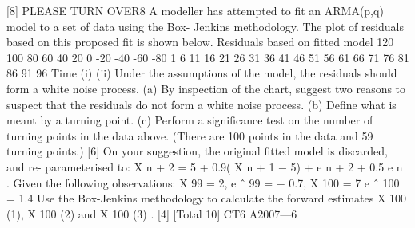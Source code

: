 \documentclass[a4paper,12pt]{article}
\begin{document}
[8]
PLEASE TURN OVER8
A modeller has attempted to fit an ARMA(p,q) model to a set of data using the Box-
Jenkins methodology. The plot of residuals based on this proposed fit is shown
below.
Residuals based on fitted model
120
100
80
60
40
20
0
-20
-40
-60
-80
1
6 11 16 21 26 31 36 41 46 51 56 61 66 71 76 81 86 91 96
Time
(i)
(ii)
Under the assumptions of the model, the residuals should form a white noise
process.
(a) By inspection of the chart, suggest two reasons to suspect that the
residuals do not form a white noise process.
(b) Define what is meant by a turning point.
(c) Perform a significance test on the number of turning points in the data
above. (There are 100 points in the data and 59 turning points.)
[6]
On your suggestion, the original fitted model is discarded, and re-
parameterised to:
X n + 2 = 5 + 0.9( X n + 1 − 5) + e n + 2 + 0.5 e n .
Given the following observations:
X 99 = 2,
e ˆ 99 = − 0.7,
X 100 = 7
e ˆ 100 = 1.4
Use the Box-Jenkins methodology to calculate the forward estimates
X 100 (1), X 100 (2) and X 100 (3) .
[4]
[Total 10]
CT6 A2007—6
\end{document}
